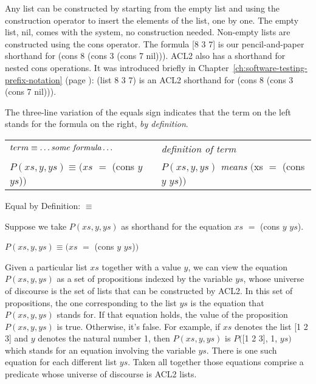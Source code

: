 Any list can be constructed by starting from the empty list
and using the construction operator to insert the elements of the list, one by one.
The empty list, nil, comes with the system, no construction needed.
Non-empty lists are constructed using the cons operator.
The formula [8 3 7] is our pencil-and-paper shorthand for (cons 8 (cons 3 (cons 7 nil))).
ACL2 also has a shorthand for nested cons operations.
It was introduced briefly in
Chapter~\ref{ch:software-testing-prefix-notation} (page \pageref{list-op-informal}):
(list 8 3 7) is an ACL2 shorthand for (cons 8 (cons 3 (cons 7 nil))).

\begin{aside}
The
three-line
variation of the equals sign
indicates that the term on the left stands
for the formula on the right, \emph{by definition}.
\begin{center}
\begin{tabular}{ll}
$term \equiv \dots \emph{some formula} \dots$    &\emph{definition of term} \\
$P(xs, y, ys) \equiv (xs$ $=$ (cons $y$ $ys$)$)$ &$P(xs, y, ys)$ \emph{means} $($xs $=$ (cons $y$ $ys$)$)$  \\
\end{tabular}
\end{center}
\caption{Equal by Definition: $\equiv$}
\label{three-line-equal}
\end{aside}

Suppose we take $P(xs, y, ys)$ as shorthand
for the equation $xs$ $=$ (cons $y$ $ys$).
\begin{center}
$P(xs, y, ys) \equiv (xs$ $=$ (cons $y$ $ys$)$)$
\end{center}

Given a particular list $xs$ together with a value $y$,
we can view the equation $P(xs, y, ys)$ as a set of propositions
indexed by the variable $ys$, whose universe of discourse is the set of
lists that can be constructed by ACL2.
In this set of propositions, the one corresponding to
the list $ys$ is the equation that $P(xs, y, ys)$ stands for.
If that equation holds, the value of the proposition $P(xs, y, ys)$ is true.
Otherwise, it's false.
For example, if $xs$ denotes the list [1 2 3]
and $y$ denotes the natural number 1,
then $P(xs, y, ys)$ is $P($[1 2 3], 1, $ys)$
which stands for an equation involving the variable $ys$.
There is one such equation for each different list $ys$.
Taken all together those equations comprise a predicate
whose universe of discourse is ACL2 lists.

